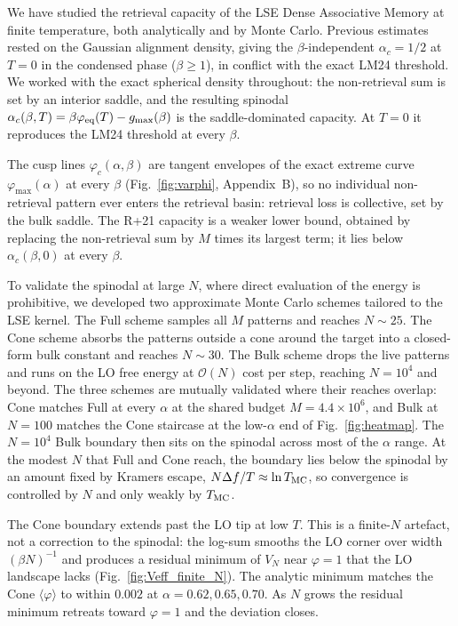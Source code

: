 \documentclass[letterpaper]{article} %
\newcommand{\avg}[1]{\langle #1 \rangle}
\newcommand{\Bnet}{\beta}
\newcommand{\ac}{\alpha_c}
\begin{document}
We have studied the retrieval capacity of the LSE Dense Associative Memory at finite temperature, both analytically and by Monte Carlo. Previous estimates rested on the Gaussian alignment density, giving the $\Bnet$-independent $\ac = 1/2$ at $T = 0$ in the condensed phase ($\Bnet \geq 1$), in conflict with the exact LM24 threshold. We worked with the exact spherical density throughout: the non-retrieval sum is set by an interior saddle, and the resulting spinodal $\ac(\Bnet, T) = \Bnet \varphi_{\rm eq}(T) - g_{\max}(\Bnet)$ is the saddle-dominated capacity. At $T = 0$ it reproduces the LM24 threshold at every $\Bnet$.

The cusp lines $\varphi_c(\alpha, \Bnet)$ are tangent envelopes of the exact extreme curve $\varphi_{\max}(\alpha)$ at every $\Bnet$ (Fig.~\ref{fig:varphi}, Appendix~B), so no individual non-retrieval pattern ever enters the retrieval basin: retrieval loss is collective, set by the bulk saddle. The R+21 capacity is a weaker lower bound, obtained by replacing the non-retrieval sum by $M$ times its largest term; it lies below $\ac(\Bnet, 0)$ at every $\Bnet$.

To validate the spinodal at large $N$, where direct evaluation of the energy is prohibitive, we developed two approximate Monte Carlo schemes tailored to the LSE kernel. The Full scheme samples all $M$ patterns and reaches $N \sim 25$. The Cone scheme absorbs the patterns outside a cone around the target into a closed-form bulk constant and reaches $N \sim 30$. The Bulk scheme drops the live patterns and runs on the LO free energy at $\mathcal{O}(N)$ cost per step, reaching $N = 10^4$ and beyond. The three schemes are mutually validated where their reaches overlap: Cone matches Full at every $\alpha$ at the shared budget $M = 4.4 \times 10^6$, and Bulk at $N = 100$ matches the Cone staircase at the low-$\alpha$ end of Fig.~\ref{fig:heatmap}. The $N = 10^4$ Bulk boundary then sits on the spinodal across most of the $\alpha$ range. At the modest $N$ that Full and Cone reach, the boundary lies below the spinodal by an amount fixed by Kramers escape, $N \Delta f / T \approx \ln T_{\rm MC}$, so convergence is controlled by $N$ and only weakly by $T_{\rm MC}$.

The Cone boundary extends past the LO tip at low $T$. This is a finite-$N$ artefact, not a correction to the spinodal: the log-sum smooths the LO corner over width $(\Bnet N)^{-1}$ and produces a residual minimum of $V_N$ near $\varphi = 1$ that the LO landscape lacks (Fig.~\ref{fig:Veff_finite_N}). The analytic minimum matches the Cone $\avg{\varphi}$ to within $0.002$ at $\alpha = 0.62, 0.65, 0.70$. As $N$ grows the residual minimum retreats toward $\varphi = 1$ and the deviation closes.
\end{document}
